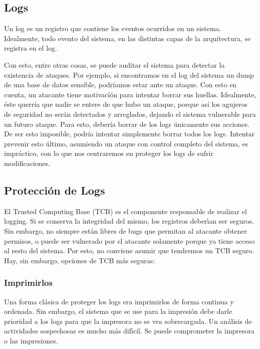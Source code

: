\subsection{Logs}

Un log es un registro que contiene los eventos ocurridos en un sistema.
Idealmente, todo evento del sistema, en las distintas capas de la arquitectura, se registra en el log.

Con esto, entre otras cosas, se puede auditar el sistema para detectar la existencia de ataques. Por ejemplo, si encontramos en el log del sistema un dump de una base de datos sensible, podríamos estar ante un ataque.
Con esto en cuenta, un atacante tiene motivacíón para intentar borrar sus huellas. Idealmente, éste querría que nadie se entere de que hubo un ataque, porque así los agujeros de seguridad no serán detectados y arreglados, dejando el sistema vulnerable para un futuro ataque. Para esto, debería borrar de los logs únicamente sus acciones. De ser esto imposible, podría intentar simplemente borrar todos los logs. Intentar prevenir esto último, asumiendo un ataque con control completo del sistema, es impráctico, con lo que nos centraremos en proteger los logs de sufrir modificaciones.

\subsection{Protección de Logs}

El Trusted Computing Base (TCB) es el componente responsable de realizar el logging. 
Si se conserva la integridad del mismo, los registros deberı́an ser seguros. 
Sin embargo, no siempre están libres de bugs que permitan al atacante obtener permisos, o puede ser vulnerado por el atacante solamente porque ya tiene acceso al resto del sistema. Por esto, no conviene asumir que tendremos un TCB seguro.
Hay, sin embargo, opciones de TCB más seguras:

\subsubsection{Imprimirlos}

Una forma clásica de proteger los logs era imprimirlos de forma continua y ordenada. Sin embargo, el sistema que se use para la impresión debe darle prioridad a los logs para que la impresora no se vea sobrecargada.
Un análisis de actividades sospechosas es mucho más difı́cil.
Se puede comprometer la impresora o las impresiones.

